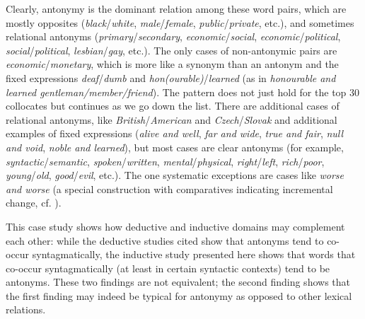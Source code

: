 Clearly, antonymy  is the dominant relation among these word pairs, which are mostly opposites (\textit{black}\slash \textit{white}, \textit{male}\slash \textit{female}, \textit{public}\slash \textit{private}, etc.), and sometimes relational antonyms (\textit{primary}\slash \textit{secondary}, \textit{economic}\slash \textit{social}, \textit{economic}\slash \textit{political}, \textit{social}\slash \textit{political}, \textit{lesbian}\slash \textit{gay}, etc.). The only cases of non\hyp{}antonymic  pairs are \textit{economic}\slash \textit{monetary}, which is more like a synonym  than an antonym and the fixed expressions \textit{deaf}\slash \textit{dumb} and \textit{hon(ourable)}\slash \textit{learned} (as in \textit{honourable and learned gentleman\slash member\slash friend}).  The pattern does not just hold for the top 30 collocates  but continues as we go down the list. There are additional cases of relational antonyms,  like \textit{British}\slash \textit{American} and \textit{Czech}\slash \textit{Slovak} and additional examples of fixed expressions (\textit{alive and well}, \textit{far and wide}, \textit{true and fair}, \textit{null and void}, \textit{noble and learned}), but most cases are clear antonyms  (for example, \textit{syntactic}\slash \textit{semantic}, \textit{spoken}\slash \textit{written}, \textit{mental}\slash \textit{physical}, \textit{right}\slash \textit{left}, \textit{rich}\slash \textit{poor}, \textit{young}\slash \textit{old}, \textit{good}\slash \textit{evil}, etc.). The one systematic exceptions are cases like \textit{worse and worse} (a special construction with comparatives indicating incremental change, cf. \citealt{stefanowitsch_wortwiederholungen_2007}).

This case study shows how deductive  and inductive  domains may complement each other: while the deductive studies cited show that antonyms  tend to co\hyp{}occur syntagmatically,  the inductive study presented here shows that words that co\hyp{}occur syntagmatically (at least in certain syntactic  contexts) tend to be antonyms. These two findings are not equivalent; the second finding shows that the first finding may indeed be typical for antonymy  as opposed to other lexical relations.

